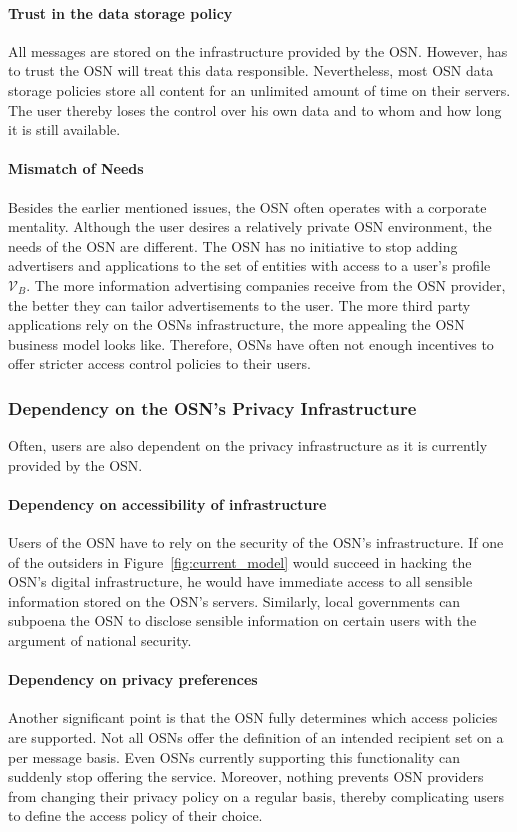 \paragraph{Trust in the data storage policy} All messages are stored on the infrastructure provided by the OSN. However, has to trust the OSN will treat this data responsible. Nevertheless, most OSN data storage policies store all content for an unlimited amount of time on their servers. The user thereby loses the control over his own data and to whom and how long it is still available.

\paragraph{Mismatch of Needs} Besides the earlier mentioned issues, the OSN often operates with a corporate mentality. Although the user desires a relatively private OSN environment, the needs of the OSN are different. The OSN has no initiative to stop adding advertisers and applications to the set of entities with access to a user's profile $\mathcal{V}_B$. The more information advertising companies receive from the OSN provider, the better they can tailor advertisements to the user. The more third party applications rely on the OSNs infrastructure, the more appealing the OSN business model looks like. Therefore, OSNs have often not enough incentives to offer stricter access control policies to their users.

\subsubsection{Dependency on the OSN's Privacy Infrastructure}
Often, users are also dependent on the privacy infrastructure as it is currently provided by the OSN.

\paragraph{Dependency on accessibility of infrastructure}
Users of the OSN have to rely on the security of the OSN's infrastructure. If one of the outsiders in Figure~\ref{fig:current_model} would succeed in hacking the OSN's digital infrastructure, he would have immediate access to all sensible information stored on the OSN's servers. Similarly, local governments can subpoena the OSN to disclose sensible information on certain users with the argument of national security.

\paragraph{Dependency on privacy preferences} Another significant point is that the OSN fully determines which access policies are supported. Not all OSNs offer the definition of an intended recipient set on a per message basis. Even OSNs currently supporting this functionality can suddenly stop offering the service. Moreover, nothing prevents OSN providers from changing their privacy policy on a regular basis, thereby complicating users to define the access policy of their choice.


